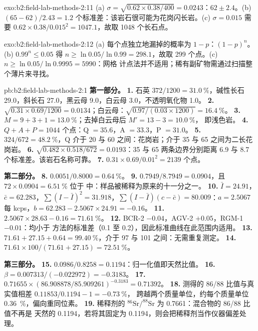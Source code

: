 \begin{solution}{exo:b2:field-lab-methods-2:11}
(a) $\sigma = \sqrt{0.62 \times 0.38/400} = 0.0243$：$62 \pm 2.4$。(b) $(65 - 62)/2.43 = 1.2$
个标准差：该岩石很可能为花岗闪长岩。(c) $\sigma = 0.015$ 需要 $0.62 \times
0.38/0.015^2 = 1047.1$，故取 1048 个长石点。
\end{solution}

\begin{solution}{exo:b2:field-lab-methods-2:12}
(a) 每个点独立地漏掉的概率为 $1 - p$：$(1-p)^n$。(b) $0.99^n \le 0.05$
得 $n \ge \ln 0.05/\ln 0.99 = 298.1$，故取 299 个点。(c) $n \ge \ln 0.05/\ln 0.9995 = 5990$：网格
计点法并不适用；稀有副矿物需通过扫描整个薄片来寻找。
\end{solution}

\begin{solution}{pb:b2:field-lab-methods-2:1}
\noindent\textbf{第一部分。}
\textbf{1.} 石英 $372/1200 = \qty{31.0}{\percent}$，碱性长石 29.0，斜长石 27.0，黑云母
9.0，白云母 3.0，不透明氧化物 1.0。
\textbf{2.} $\sqrt{0.31 \times 0.69/1200} = 0.0134$；白云母：$\sqrt{0.97/(0.03 \times 1200)} =
\qty{16.4}{\percent}$。
\textbf{3.} $M = 9 + 3 + 1 = \qty{13.0}{\percent}$；去掉白云母后 $M' = 13 - 3 = \qty{10.0}{\percent}$，
即浅色岩。
\textbf{4.} $Q + A + P = 1044$ 个点：Q $= 35.6$，A $= 33.3$，P $= 31.0$。
\textbf{5.} $324/672 = \qty{48.2}{\percent}$，Q 介于 20 与 60 之间：花岗岩；介于 35 与
65 之间为二长花岗岩。
\textbf{6.} $\sqrt{0.482 \times 0.518/672} = 0.0193$：35 与 65 两条边界分别距离
6.9 与 8.7 个标准差。该岩石名称可靠。
\textbf{7.} $0.31 \times 0.69/0.01^2 = 2139$ 个点。

\noindent\textbf{第二部分。}
\textbf{8.} $0.0051/0.8000 = \qty{0.64}{\percent}$。
\textbf{9.} $0.7949/8.7949 = 0.0904$，且 $72 \times 0.0904 = \qty{6.51}{\percent}$  位于
中：样品被稀释为原来的十一分之一。
\textbf{10.} $\bar I = 24.91$，$\bar c = 62.283$，$\sum(I - \bar I)^2 = 31.918$，$\sum(I - \bar I)(c -
\bar c) = 80.009$：$a = 2.5067$ 每 kcps，$b = 62.283 - 2.5067 \times 24.91 = -0.16$。
\textbf{11.} $2.5067 \times 28.63 - 0.16 = \qty{71.61}{\percent}$。
\textbf{12.} BCR-2 $-0.04$，AGV-2 $+0.05$，RGM-1 $-0.01$：均小于
方法的标准差（0.1 至 0.2），因此标准曲线在此范围内适用。
\textbf{13.} $71.61 + 27.15 + 0.64 = \qty{99.40}{\percent}$，介于 97 与 101 之间：无需重复测定。
\textbf{14.} $71.61 \times 100/(71.61 + 27.15) = \qty{72.51}{\percent}$。

\noindent\textbf{第三部分。}
\textbf{15.} $0.0986/0.8258 = 0.1194$：归一化值即天然比值。
\textbf{16.} $\beta = 0.007313/(-0.022972) = -0.3183$。
\textbf{17.} $0.71655 \times (86.908878/85.909261)^{-0.3183} = 0.71392$。
\textbf{18.} 测得的 86/88 比值与真实值相差 $0.11853/0.1194 - 1 = \qty{-0.73}{\percent}$，
跨越两个质量单位，约每个质量单位 \qty{0.36}{\percent}，偏向重同位素。
\textbf{19.} 稀释剂的 $^{86}\mathrm{Sr}/^{88}\mathrm{Sr}$ 为 0.7661：混合物的 86/88 比值不再是
天然的 0.1194，若将其固定为 0.1194，则会把稀释剂当作仪器偏差处理。


\end{solution}
